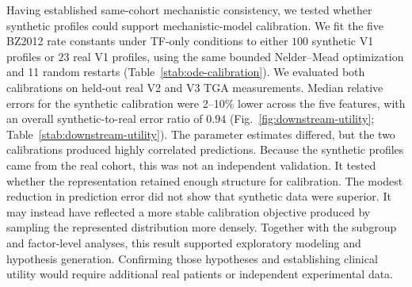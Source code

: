 Having established same-cohort mechanistic consistency, we tested whether synthetic profiles
could support mechanistic-model calibration. We fit the
five BZ2012 rate constants under TF-only conditions to either $100$ synthetic V1 profiles or
$23$ real V1 profiles, using the same bounded Nelder--Mead optimization and 11 random restarts
(Table~\ref{stab:ode-calibration}). We evaluated both calibrations on held-out real V2 and V3
TGA measurements. Median relative errors for the synthetic calibration were 2--10\% lower
across the five features, with an overall synthetic-to-real error ratio of $0.94$
(Fig.~\ref{fig:downstream-utility}; Table~\ref{stab:downstream-utility}). The parameter
estimates differed, but the two calibrations produced highly correlated predictions. Because
the synthetic profiles came from the real cohort, this was not an independent validation. It
tested whether the representation retained enough structure for calibration.
The modest reduction in prediction error did not show that synthetic data were
superior. It may instead have reflected a more stable calibration objective produced by
sampling the represented distribution more densely. Together with the subgroup and
factor-level analyses, this result supported exploratory modeling and hypothesis generation.
Confirming those hypotheses and establishing clinical utility would require additional real
patients or independent experimental data.
